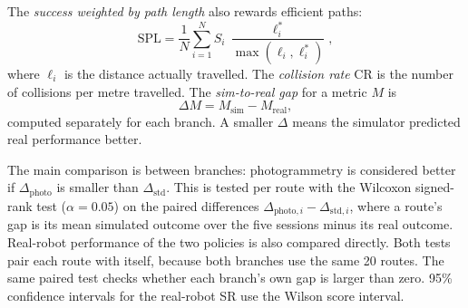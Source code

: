 The \emph{success weighted by path length} \cite{anderson2018evaluation} also rewards efficient
paths:
\begin{equation}
\mathrm{SPL}=\frac{1}{N}\sum_{i=1}^{N} S_i\,\frac{\ell^*_i}{\max(\ell_i,\ell^*_i)},
\label{eq:spl}
\end{equation}
where $\ell_i$ is the distance actually travelled. The \emph{collision rate} CR is the number of
collisions per metre travelled. The \emph{sim-to-real gap} for a metric $M$ is
\begin{equation}
\Delta M = M_{\text{sim}} - M_{\text{real}},
\label{eq:gap}
\end{equation}
computed separately for each branch. A smaller $\Delta$ means the simulator predicted real
performance better.

The main comparison is between branches: photogrammetry is considered better if
$\Delta_{\text{photo}}$ is smaller than $\Delta_{\text{std}}$. This is tested per route with the
Wilcoxon signed-rank test ($\alpha=0.05$) on the paired differences
$\Delta_{\text{photo},i}-\Delta_{\text{std},i}$, where a route's gap is its mean simulated outcome
over the five sessions minus its real outcome. Real-robot performance of the two policies is also
compared directly. Both tests pair each route with itself, because both branches use the same
20 routes. The same paired test checks whether each branch's own gap is larger than zero. 95\%
confidence intervals for the real-robot SR use the Wilson score interval.
